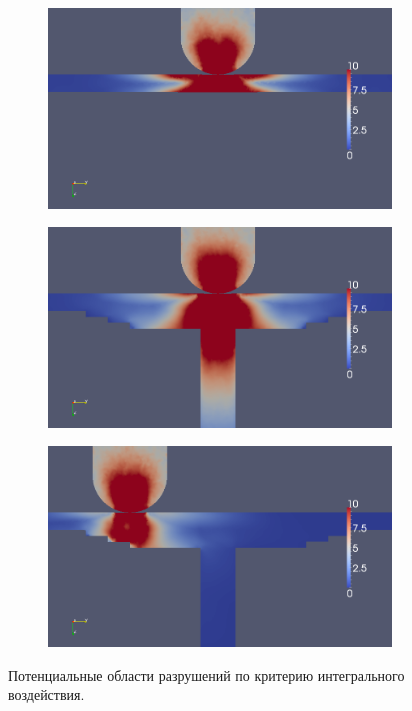 \begin{figure}[h]
\begin{subfigure}[b]{0.3\textwidth}
\center
\includegraphics[width=\textwidth]{png/pkm-experiment/wing-only/sum.png}
\end{subfigure}
\begin{subfigure}[b]{0.3\textwidth}
\center
\includegraphics[width=\textwidth]{png/pkm-experiment/wing-stringer/sum.png}
\end{subfigure}
\begin{subfigure}[b]{0.3\textwidth}
\center
\includegraphics[width=\textwidth]{png/pkm-experiment/wing-stringer-non-center/sum.png}
\end{subfigure}
\caption{Потенциальные области разрушений по критерию интегрального воздействия.}
\label{pic:pkm_experiment_compare_integral}
\end{figure}

